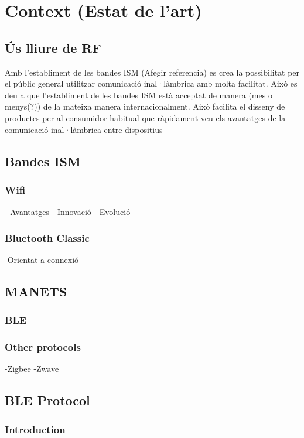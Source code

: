 \chapter{Context (Estat de l'art)}\label{C:compaginacio}

\section{Ús lliure de RF}
Amb l'establiment de les bandes ISM (Afegir referencia) es crea la possibilitat per el públic general utilitzar comunicació inal·làmbrica amb molta facilitat. Això es deu a que l'establiment de les bandes ISM està acceptat de manera (mes o menys(?)) de la mateixa manera internacionalment.
Això facilita el disseny de productes per al consumidor habitual que ràpidament veu els avantatges de la comunicació inal·làmbrica entre dispositius

\section{Bandes ISM}

\subsection{Wifi}
- Avantatges
- Innovació
- Evolució

\subsection{Bluetooth Classic}
-Orientat a connexió



\section{MANETS}

\subsection{BLE}

\subsection{Other protocols}
-Zigbee
-Zwave


\section{BLE Protocol}
\subsection{Introduction}
